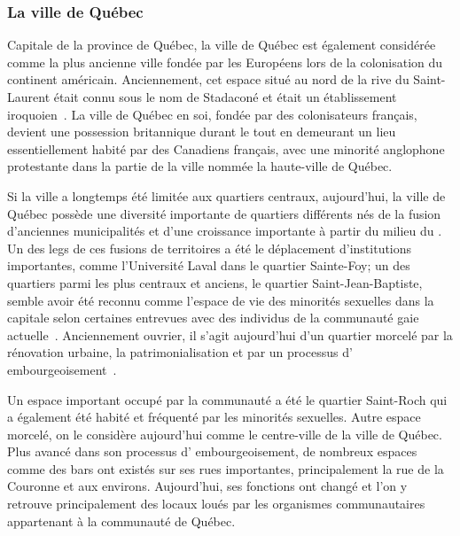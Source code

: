 \subsubsection{La ville de Québec}
Capitale de la province de Québec, la ville de Québec est également considérée comme la plus ancienne ville fondée par les Européens lors de la colonisation du continent américain. 
Anciennement, cet espace situé au nord de la rive du Saint-Laurent était connu sous le nom de Stadaconé et était un établissement iroquoien~\citep[91]{Dickason1996}. 
La ville de Québec en soi, fondée par des colonisateurs français, devient une possession britannique durant le  tout en demeurant un lieu essentiellement habité par des Canadiens français, avec une minorité anglophone protestante dans la partie de la ville nommée la haute-ville de Québec\missref{}.

Si la ville a longtemps été limitée aux quartiers centraux, aujourd'hui, la ville de Québec possède une diversité importante de quartiers différents nés de la fusion d'anciennes municipalités et d'une croissance importante à partir du milieu du . 
Un des legs de ces fusions de territoires a été le déplacement d'institutions importantes, comme l'Université Laval dans le quartier Sainte-Foy; un des quartiers parmi les plus centraux et anciens, le quartier Saint-Jean-Baptiste, semble avoir été reconnu comme l'espace de vie des minorités sexuelles dans la capitale selon certaines entrevues avec des individus de la communauté gaie actuelle~\citep{CSJB2011}. 
Anciennement ouvrier, il s'agit aujourd'hui d'un quartier morcelé par la rénovation urbaine, la patrimonialisation et par un processus d’ embourgeoisement~\citep{Hatvany2005,Mercier2014}.

Un espace important occupé par la communauté \lgbt{} a été le quartier Saint-Roch qui a également été habité et fréquenté par les minorités sexuelles.
Autre espace morcelé, on le considère aujourd'hui comme le centre-ville de la ville de Québec. 
Plus avancé dans son processus d’ embourgeoisement, de nombreux espaces \lgbt{} comme des bars ont existés sur ses rues importantes, principalement la rue de la Couronne et aux environs. 
Aujourd'hui, ses fonctions ont changé et l'on y retrouve principalement des locaux loués par les organismes communautaires appartenant à la communauté \lgbt{} de Québec.

